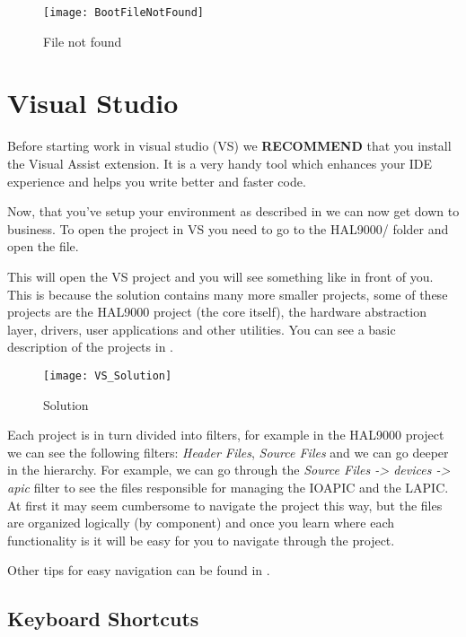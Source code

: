 \begin{appendices}
\begin{figure}
	\centering
	\texttt{[image: BootFileNotFound]}
		\caption{File not found}
	\label{fig:BootFileNotFound}
\end{figure}

\section{Visual Studio}
\label{sect:VisualStudio}

Before starting work in visual studio (VS) we \textbf{RECOMMEND} that you install the Visual Assist
\cite{visualAssist} extension. It is a very handy tool which enhances your IDE experience and helps
you write better and faster code.

Now, that you've setup your environment as described in  we can now get down
to business. To open the project in VS you need to go to the HAL9000/ folder and open the
 file.

This will open the \projectname VS project and you will see something like 
in front of you. This is because the solution contains many more smaller projects, some of these
projects are the HAL9000 project (the core itself), the hardware abstraction layer, drivers, user
applications and other utilities. You can see a basic description of the projects in
.

\begin{figure}
	\centering
	\texttt{[image: VS\_Solution]}
		\caption{\projectname Solution}
	\label{fig:VSSolution}
\end{figure}

Each project is in turn divided into filters, for example in the HAL9000 project we can see the
following filters: \textit{Header Files}, \textit{Source Files} and we can go deeper in the hierarchy.
For example, we can go through the \textit{Source Files -> devices -> apic} filter to see the files
responsible for managing the IOAPIC and the LAPIC. At first it may seem cumbersome to navigate the
project this way, but the files are organized logically (by component) and once you learn where each
functionality is it will be easy for you to navigate through the project.

Other tips for easy navigation can be found in .

\subsection{Keyboard Shortcuts}
\label{sect:KeyboardShortcuts}


\end{appendices}
